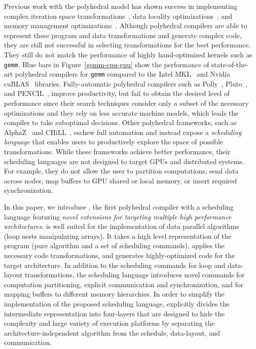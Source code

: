 Previous work with the polyhedral model has shown success in implementing complex iteration space transformations~\cite{wolf1991loop,bondhugula_practical_2008,trifunovic_graphite_2010,polly,Vasilache2018TensorCF}, data locality optimizations~\cite{Iri88,tobias_hexagonal_cgo13}, and memory management optimizations~\cite{feautrier_array_1988,thies_unified_2001,lefebvre_automatic_1998,Qui00,Darte_contraction_2005}.
Although polyhedral compilers are able to represent these program and data transformations and generate complex code, they are still not successful in selecting transformations for the best performance. They still do not match the performance of highly hand-optimized kernels such as \texttt{gemm}. Blue bars in Figure~\ref{gemm-cpu-gpu} show the performance of state-of-the-art polyhedral compilers for \texttt{gemm} compared to the Intel MKL~\cite{mkl} and Nvidia cuBLAS~\cite{cublas} libraries.
Fully-automatic polyhedral compilers such as Polly~\cite{polly}, Pluto~\cite{bondhugula_practical_2008}, and PENCIL~\cite{pencil_paper,pencil_pact}, improve productivity, but fail to obtain the desired level of performance since their search techniques consider only a subset of the necessary optimizations and they rely on less accurate machine models, which leads the compiler to take suboptimal decisions.
Other polyhedral frameworks, such as AlphaZ~\cite{yuki2012alphaz} and CHiLL~\cite{chill}, eschew full automation and instead expose a \textit{scheduling language} that enables users to productively explore the space of possible transformations.
While these frameworks achieve better performance, their scheduling languages are not designed to target GPUs and distributed systems. For example, they do not allow the user to partition computations, send data across nodes, map buffers to GPU shared or local memory,  or insert required synchronization.

In this paper, we introduce \framework{}, the first polyhedral compiler with a scheduling language featuring \emph{novel extensions for targeting multiple high performance architectures}.
\framework{} is well suited for the implementation of data parallel algorithms (loop nests manipulating arrays).
It takes a high level representation of the program (pure algorithm and a set of scheduling commands), applies the necessary code transformations, and generates highly-optimized code for the target architecture.   
In addition to the scheduling commands for loop and data-layout transformations, the \framework{} scheduling language introduces novel commands for computation partitioning, explicit communication and synchronization, and for mapping buffers to different memory hierarchies.
In order to simplify the implementation of the proposed scheduling language, \framework{} explicitly divides the intermediate representation into four-layers that are designed to hide the complexity and large variety of execution platforms by separating the architecture-independent algorithm from the schedule, data-layout, and communication.

